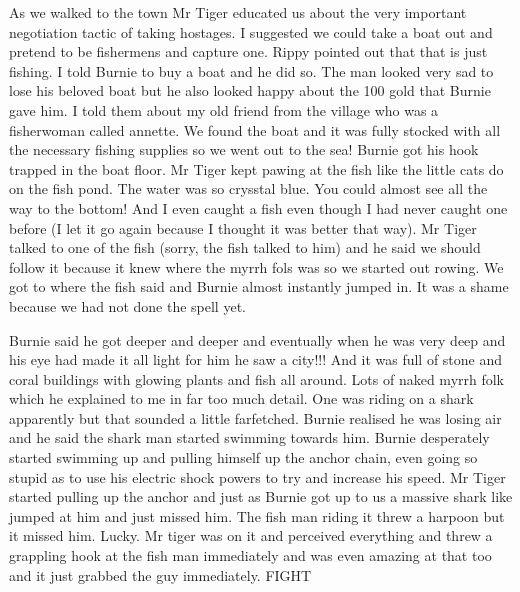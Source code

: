 As we walked to the town Mr Tiger educated us about the very important negotiation tactic of taking hostages. I suggested we could take a boat out and pretend to be fishermens and capture one. Rippy pointed out that that is just fishing. I told Burnie to buy a boat and he did so. The man looked very sad to lose his beloved boat but he also looked happy about the 100 gold that Burnie gave him. I told them about my old friend from the village who was a fisherwoman called annette. We found the boat and it was fully stocked with all the necessary fishing supplies so we went out to the sea! Burnie got his hook trapped in the boat floor. Mr Tiger kept pawing at the fish like the little cats do on the fish pond. The water was so crysstal blue. You could almost see all the way to the bottom! And I even caught a fish even though I had never caught one before (I let it go again because I thought it was better that way). Mr Tiger talked to one of the fish (sorry, the fish talked to him) and he said we should follow it because it knew where the myrrh fols was so we started out rowing. We got to where the fish said and Burnie almost instantly jumped in. It was a shame because we had not done the spell yet.\medskip

Burnie said he got deeper and deeper and eventually when he was very deep and his eye had made it all light for him he saw a city!!! And it was full of stone and coral buildings with glowing plants and fish all around. Lots of naked myrrh folk which he explained to me in far too much detail. One was riding on a shark apparently but that sounded a little farfetched. Burnie realised he was losing air and he said the shark man started swimming towards him. Burnie desperately started swimming up and pulling himself up the anchor chain, even going so stupid as to use his electric shock powers to try and increase his speed. Mr Tiger started pulling up the anchor and just as Burnie got up to us a massive shark like jumped at him and just missed him. The fish man riding it threw a harpoon but it missed him. Lucky. Mr tiger was on it and perceived everything and threw a grappling hook at the fish man immediately and was even amazing at that too and it just grabbed the guy immediately. FIGHT\medskip

